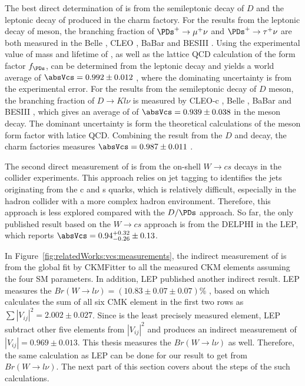 The best direct determination of \absVcs is from the semileptonic decay of $D$ and the leptonic decay of \PDs produced in the charm factory. For the results from the leptonic decay of \PDs meson, the branching fraction of $\PDs^+ \to \mu^+ \nu$ and $\PDs^+ \to \tau^+ \nu$ are both measured in the Belle \cite{Zupanc:2013byn}, CLEO \cite{Alexander:2009ux,Onyisi:2009th,Naik:2009tk}, BaBar \cite{delAmoSanchez:2010jg} and BESIII \cite{Ablikim:2016duz, Ablikim:2018jun}. Using the experimental value of mass and lifetime of \PDs, as well as the lattice QCD calculation of the form factor $f_{\PDs}$, \absVcs can be determined from the \PDs leptonic decay and yields a world average of $\absVcs=0.992\pm 0.012$ \cite{Amhis:2019ckw}, where the dominating uncertainty is from the experimental error. For the results from the semileptonic decay of $D$ meson, the branching fraction of $D\to K l\nu$ is measured by CLEO-c \cite{Besson:2009uv}, Belle \cite{Widhalm:2006wz}, BaBar \cite{Aubert:2007wg} and BESIII \cite{Ablikim:2015ixa, Ablikim:2018evp}, which gives an average of \absVcs of $\absVcs=0.939\pm 0.038$ \cite{Amhis:2019ckw} in the \PD meson decay. The dominant uncertainty is form the theoretical calculations of the \PD meson form factor with latice QCD. Combining the result from the $D$ and \PDs decay, the charm factories measures $\absVcs=0.987\pm 0.011$ \cite{Amhis:2019ckw}.

The second direct measurement of \absVcs is from the on-shell $W\to c s$ decays in the collider experiments. This approach relies on jet tagging to identifies the jets originating from the c and s quarks, which is relatively difficult, especially in the hadron collider with a more complex hadron environment. Therefore, this approach is less explored compared with the $D/\PDs$ approach. So far, the only published result based on the $W\to c s$  approach is from the DELPHI in the LEP, which reports $\absVcs=0.94 ^{+0.32}_{-0.26}\pm 0.13$. \cite{Abreu:1998ap}

In Figure~\ref{fig:relatedWorks:vcs:measurements}, the indirect measurement of \absVcs is from the global fit by CKMFitter to all the measured CKM elements assuming the four SM parameters. In addition, LEP published another indirect result. LEP measures the $Br(W\to l \nu) = (10.83 \pm 0.07 \pm 0.07) \%$ \cite{Schael:2013ita}, based on which calculates the sum of all six CMK element in the first two rows as $\sum |V_{ij}|^2 = 2.002 \pm 0.027$. Since \absVcs is the least precisely measured element, LEP subtract other five elements from $|V_{ij}|^2 $ and produces an indirect measurement of $|V_{ij}|=0.969\pm 0.013$. This thesis measures the $Br(W\to l \nu) $ as well. Therefore, the same calculation as LEP can be done for our result to get \absVcs from $Br(W\to l \nu)$. The next part of this section covers about the steps of the such calculations.


